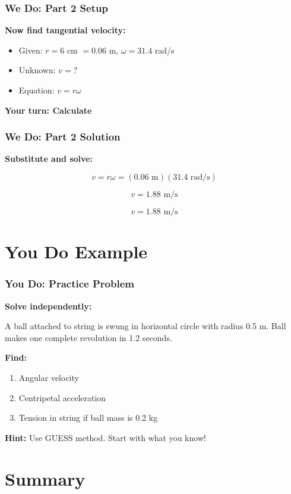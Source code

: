 \documentclass{beamer}
\begin{document}
\begin{frame}
\frametitle{We Do: Part 2 Setup}
\textbf{Now find tangential velocity:}
\pause
\begin{itemize}
    \item Given: $r = 6$ cm $= 0.06$ m, $\omega = 31.4$ rad/s
    \pause
    \item Unknown: $v = ?$
    \pause
    \item Equation: $v = r\omega$
\end{itemize}
\pause

\textbf{Your turn: Calculate}
\end{frame}

\begin{frame}
\frametitle{We Do: Part 2 Solution}
\textbf{Substitute and solve:}
\pause

\[ v = r\omega = (0.06 \text{ m})(31.4 \text{ rad/s}) \]
\pause

\[ v = 1.88 \text{ m/s} \]
\pause

\[\boxed{v = 1.88 \text{ m/s}}\]
\end{frame}

\section{You Do Example}

\begin{frame}
\frametitle{You Do: Practice Problem}
\textbf{Solve independently:}

A ball attached to string is swung in horizontal circle with radius 0.5 m. Ball makes one complete revolution in 1.2 seconds.

\textbf{Find:}
\begin{enumerate}
    \item Angular velocity
    \item Centripetal acceleration
    \item Tension in string if ball mass is 0.2 kg
\end{enumerate}

\vspace{0.5cm}
\textbf{Hint:} Use GUESS method. Start with what you know!
\end{frame}

\section{Summary}
\end{document}
